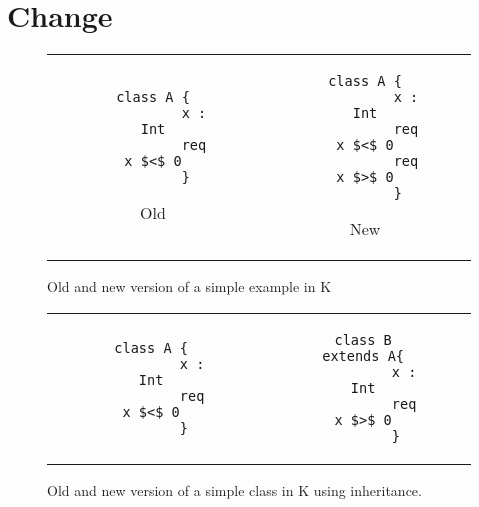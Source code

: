 \section{Change}
\label{sec:change}

\begin{figure}
  \centering
  \begin{tabular}[c]{cc}
    \begin{subfigure}[c]{0.4\textwidth}
      \begin{lstlisting}[mathescape]
        class A {
          x : Int
          req x $<$ 0
        }
      \end{lstlisting}
      \caption{Old}
      \label{fig:old1}
    \end{subfigure}
    &
    \begin{subfigure}[c]{0.4\textwidth}
      \begin{lstlisting}[mathescape]
        class A {
          x : Int
          req x $<$ 0
          req x $>$ 0
        }
      \end{lstlisting}
      \caption{New}
      \label{fig:new1}
    \end{subfigure}
    \\
  \end{tabular}    
  \caption{Old and new version of a simple example in K}
  \label{fig:example1}
\end{figure}

\begin{figure}
  \centering
  \begin{tabular}[c]{cc}
    \begin{subfigure}[c]{0.4\textwidth}
      \begin{lstlisting}[mathescape]
        class A {
          x : Int
          req x $<$ 0
        }
      \end{lstlisting}
      \label{fig:old1}
    \end{subfigure}
    &
    \begin{subfigure}[c]{0.4\textwidth}
      \begin{lstlisting}[mathescape]
        class B extends A{
          x : Int
          req x $>$ 0
        }
      \end{lstlisting}
      \label{fig:new1}
    \end{subfigure}
    \\
  \end{tabular}    
  \caption{Old and new version of a simple class in K using inheritance.}
  \label{fig:example1}
\end{figure}

